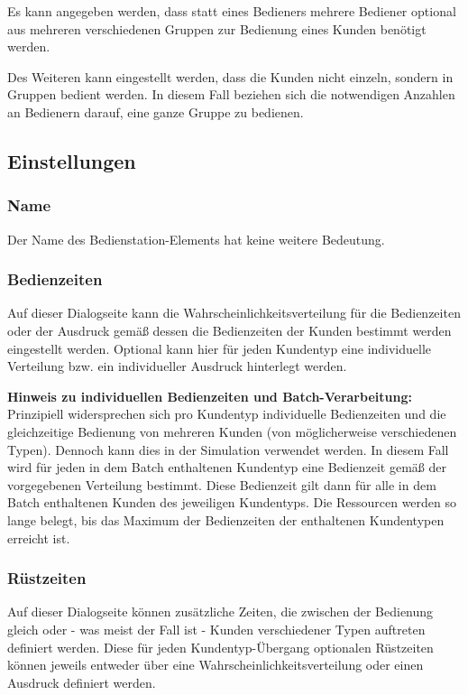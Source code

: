 Es kann angegeben werden, dass statt eines Bedieners mehrere Bediener optional aus mehreren verschiedenen Gruppen zur Bedienung
eines Kunden benötigt werden.

Des Weiteren kann eingestellt werden, dass die Kunden nicht einzeln, sondern in Gruppen bedient werden. In diesem Fall
beziehen sich die notwendigen Anzahlen an Bedienern darauf, eine ganze Gruppe zu bedienen.

\subsection*{Einstellungen}

\subsubsection*{Name}

Der Name des Bedienstation-Elements hat keine weitere Bedeutung.

\subsubsection*{Bedienzeiten}

Auf dieser Dialogseite kann die Wahrscheinlichkeitsverteilung für die Bedienzeiten oder der Ausdruck gemäß
dessen die Bedienzeiten der Kunden bestimmt werden eingestellt werden. Optional
kann hier für jeden Kundentyp eine individuelle Verteilung bzw. ein individueller Ausdruck hinterlegt werden.

\textbf{Hinweis zu individuellen Bedienzeiten und Batch-Verarbeitung:}~\\
Prinzipiell widersprechen sich pro Kundentyp individuelle Bedienzeiten und die gleichzeitige Bedienung von mehreren Kunden
(von möglicherweise verschiedenen Typen). Dennoch kann dies in der Simulation verwendet werden. In diesem Fall wird für jeden
in dem Batch enthaltenen Kundentyp eine Bedienzeit gemäß der vorgegebenen Verteilung bestimmt. Diese Bedienzeit gilt dann
für alle in dem Batch enthaltenen Kunden des jeweiligen Kundentyps. Die Ressourcen werden so lange belegt, bis das
Maximum der Bedienzeiten der enthaltenen Kundentypen erreicht ist.

\subsubsection*{Rüstzeiten}

Auf dieser Dialogseite können zusätzliche Zeiten, die zwischen der Bedienung gleich oder - was meist der Fall ist -
Kunden verschiedener Typen auftreten definiert werden. Diese für jeden Kundentyp-Übergang optionalen Rüstzeiten
können jeweils entweder über eine Wahrscheinlichkeitsverteilung oder einen Ausdruck definiert werden.

